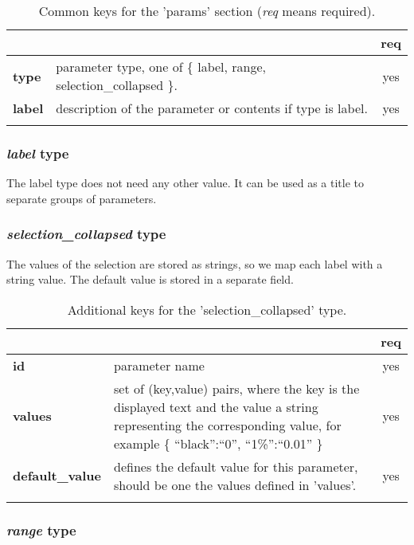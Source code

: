 \begin{longtable}{|>{\bf}L{\linewidth}|L{\linewidth}|c|}
\hline
      &  & {\bf req} 
\tabularnewline \hline \hline
 type  & parameter type, one of \{ label, range, selection\_collapsed \}.
                     & yes \\ \hline
 label & description of the parameter or contents if type is label. & yes
                      \\ \hline
\caption{Common keys for the 'params' section ({\em req} means required).}
\end{longtable}


\subsubsection{ \emph{label} type}
The label type does not need any other value. It can be used as a title to 
separate groups of parameters.

\subsubsection{ \emph{selection\_collapsed} type}

The values of the selection are stored as strings, so we map each label with a 
string value. The default value is stored in a separate field.

\begin{longtable}{|>{\bf}L{\linewidth}|L{\linewidth}|c|}
\hline
      &  & {\bf req} 
\tabularnewline \hline \hline
 id     & parameter name  & yes \\ \hline
 values & set of (key,value) pairs, where the key is the displayed text and the 
value a string representing the corresponding value, for example \{ 
``black'':``0'', ``1\%'':``0.01'' \} & yes
                      \\ \hline
 default\_value & defines the default value for this parameter, should be one 
the values defined in 'values'. & yes \\ \hline
\caption{Additional keys for the 'selection\_collapsed' type.}
\end{longtable}

\subsubsection{ \emph{range} type}

